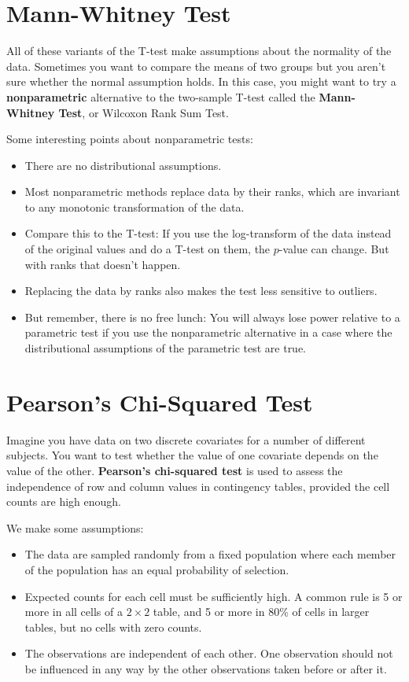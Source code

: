 
\section{Mann-Whitney Test}

All of these variants of the T-test make assumptions about the normality of the data. Sometimes you want to compare the means of two groups but you aren't sure whether the normal assumption holds. In this case, you might want to try a \textbf{nonparametric} alternative to the two-sample T-test called the \textbf{Mann-Whitney Test}, or Wilcoxon Rank Sum Test. 

Some interesting points about nonparametric tests:
\begin{itemize}
\item There are no distributional assumptions.
\item Most nonparametric methods replace data by their ranks, which are invariant to any monotonic transformation of the data.
\item Compare this to the T-test: If you use the log-transform of the data instead of the original values and do a T-test on them, the $p$-value can change. But with ranks that doesn't happen.
\item Replacing the data by ranks also makes the test less sensitive to outliers.
\item But remember, there is no free lunch: You will always lose power relative to a parametric test if you use the nonparametric alternative in a case where the distributional assumptions of the parametric test are true.
\end{itemize}


\section{Pearson's Chi-Squared Test}

Imagine you have data on two discrete covariates for a number of different subjects. You want to test whether the value of one covariate depends on the value of the other. \textbf{Pearson's chi-squared test} is used to assess the independence of row and column values in contingency tables, provided the cell counts are high enough.

We make some assumptions:
\begin{itemize}
\item The data are sampled randomly from a fixed population where each member of the population has an equal probability of selection.
\item Expected counts for each cell must be sufficiently high. A common rule is 5 or more in all cells of a $2\times 2$ table, and 5 or more in 80\% of cells in larger tables, but no cells with zero counts.
\item The observations are independent of each other. One observation should not be influenced in any way by the other observations taken before or after it.
\end{itemize}

